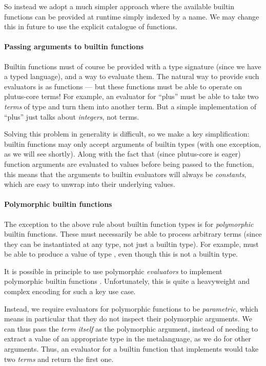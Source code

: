 So instead we adopt a much simpler approach where the available builtin functions can be provided at runtime simply indexed by a name.
We may change this in future to use the explicit catalogue of functions.

\paragraph{Passing arguments to builtin functions}

Builtin functions must of course be provided with a type signature (since we have a typed language), and a way to evaluate them.
The natural way to provide such evaluators is as functions --- but these functions must be able to operate on \gls{plutus-core} terms!
For example, an evaluator for ``plus'' must be able to take two \emph{terms} of type  and turn them into another term.
But a simple implementation of ``plus'' just talks about \emph{integers}, not terms.

Solving this problem in generality is difficult, so we make a key simplification: builtin functions may only accept arguments of builtin types (with one exception, as we will see shortly).
Along with the fact that (since \gls{plutus-core} is eager) function arguments are evaluated to values before being passed to the function, this means that the arguments to builtin evaluators will always be \emph{constants}, which are easy to unwrap into their underlying values.

\paragraph{Polymorphic builtin functions}
\label{sec:polymorphic-builtins}

The exception to the above rule about builtin function types is for \emph{polymorphic} builtin functions.
These must necessarily be able to process arbitrary terms (since they can be instantiated at any type, not just a builtin type).
For example,  must be able to produce a value of type , even though this is not a builtin type.

It is possible in principle to use polymorphic \emph{evaluators} to implement polymorphic builtin functions \autocite{lindley2012embedding}.
Unfortunately, this is quite a heavyweight and complex encoding for such a key use case.

Instead, we require evaluators for polymorphic functions to be \emph{parametric}, which means in particular that they do not inspect their polymorphic arguments.
We can thus pass the \emph{term itself} as the polymorphic argument, instead of needing to extract a value of an appropriate type in the metalanguage, as we do for other arguments.
Thus, an evaluator for a builtin function that implements  would take two \emph{terms} and return the first one.

